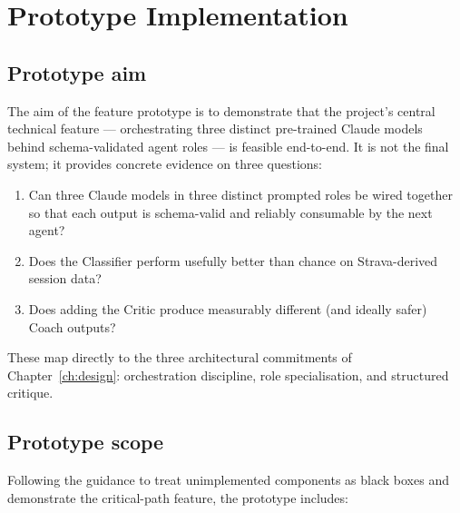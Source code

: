 
\chapter{Prototype Implementation}
\label{ch:prototype}

\section{Prototype aim}

The aim of the feature prototype is to demonstrate that the project's central technical feature --- orchestrating three distinct pre-trained Claude models behind schema-validated agent roles --- is feasible end-to-end. It is not the final system; it provides concrete evidence on three questions:

\begin{enumerate}
  \item Can three Claude models in three distinct prompted roles be wired together so that each output is schema-valid and reliably consumable by the next agent?
  \item Does the Classifier perform usefully better than chance on Strava-derived session data?
  \item Does adding the Critic produce measurably different (and ideally safer) Coach outputs?
\end{enumerate}

These map directly to the three architectural commitments of Chapter~\ref{ch:design}: orchestration discipline, role specialisation, and structured critique.

\section{Prototype scope}

Following the guidance to treat unimplemented components as black boxes and demonstrate the critical-path feature, the prototype includes:

